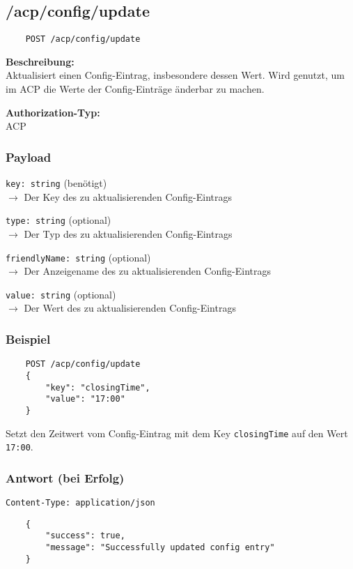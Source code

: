 \subsection{/acp/config/update}

\begin{lstlisting}
    POST /acp/config/update
\end{lstlisting}

\textbf{Beschreibung:} \\
Aktualisiert einen Config-Eintrag, insbesondere dessen Wert. Wird genutzt, um im ACP die Werte der Config-Einträge änderbar zu machen.

\textbf{Authorization-Typ:} \\
ACP

\subsubsection{Payload}

\lstinline{key: string} (benötigt) \\
$\rightarrow$ Der Key des zu aktualisierenden Config-Eintrags

\lstinline{type: string} (optional) \\
$\rightarrow$ Der Typ des zu aktualisierenden Config-Eintrags

\lstinline{friendlyName: string} (optional) \\
$\rightarrow$ Der Anzeigename des zu aktualisierenden Config-Eintrags

\lstinline{value: string} (optional) \\
$\rightarrow$ Der Wert des zu aktualisierenden Config-Eintrags


\subsubsection{Beispiel}

\begin{lstlisting}
    POST /acp/config/update
    {
        "key": "closingTime",
        "value": "17:00"
    }
\end{lstlisting}

Setzt den Zeitwert vom Config-Eintrag mit dem Key \lstinline{closingTime} auf den Wert \lstinline{17:00}.

\subsubsection{Antwort (bei Erfolg)}

\lstinline{Content-Type: application/json}
\begin{lstlisting}
    {
        "success": true, 
        "message": "Successfully updated config entry"
    }
\end{lstlisting}